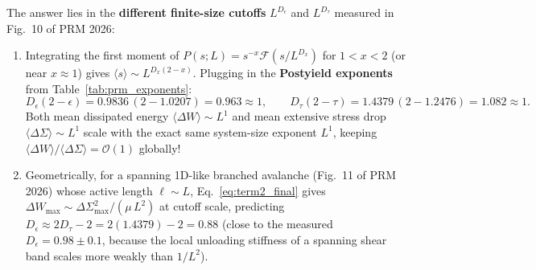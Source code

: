 \documentclass[11pt,a4paper]{article}
\newcommand{\dS}{\Delta\Sigma}
\newcommand{\dW}{\Delta W}
\begin{document}
The answer lies in the \textbf{different finite-size cutoffs} $L^{D_\epsilon}$ and $L^{D_\tau}$ measured in Fig.~10 of PRM 2026:
\begin{enumerate}[nosep]
  \item Integrating the first moment of $P(s;L) = s^{-x}\mathcal{F}(s/L^{D_x})$ for $1 < x < 2$ (or near $x\approx 1$) gives $\langle s \rangle \sim L^{D_x(2-x)}$. Plugging in the \textbf{Postyield exponents} from Table~\ref{tab:prm_exponents}:
  \begin{equation}
  D_\epsilon(2-\epsilon) = 0.9836\,(2 - 1.0207) = \mathbf{0.963} \approx 1,
  \qquad
  D_\tau(2-\tau) = 1.4379\,(2 - 1.2476) = \mathbf{1.082} \approx 1.
  \end{equation}
  Both mean dissipated energy $\langle\dW\rangle \sim L^1$ and mean extensive stress drop $\langle\dS\rangle \sim L^1$ scale with the exact same system-size exponent $L^1$, keeping $\langle\dW\rangle/\langle\dS\rangle = \mathcal{O}(1)$ globally!
  \item Geometrically, for a spanning 1D-like branched avalanche (Fig.~11 of PRM 2026) whose active length $\ell \sim L$, Eq.~\eqref{eq:term2_final} gives $\dW_{\max} \sim \dS_{\max}^2 / (\mu\,L^2)$ at cutoff scale, predicting $D_\epsilon \approx 2 D_\tau - 2 = 2(1.4379) - 2 = \mathbf{0.88}$ (close to the measured $D_\epsilon = 0.98 \pm 0.1$, because the local unloading stiffness of a spanning shear band scales more weakly than $1/L^2$).
\end{enumerate}
\end{document}
